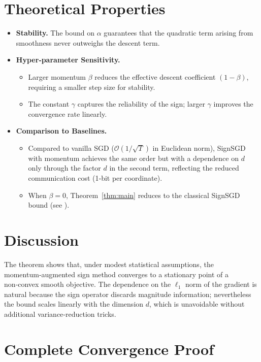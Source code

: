 \documentclass[11pt]{article}
\begin{document}
\section{Theoretical Properties}
\begin{itemize}
    \item \textbf{Stability.} The bound on $\alpha$ guarantees that the quadratic term arising from smoothness never outweighs the descent term.
    \item \textbf{Hyper‑parameter Sensitivity.}
    \begin{itemize}
        \item Larger momentum $\beta$ reduces the effective descent coefficient $(1-\beta)$, requiring a smaller step size for stability.
        \item The constant $\gamma$ captures the reliability of the sign; larger $\gamma$ improves the convergence rate linearly.
    \end{itemize}
    \item \textbf{Comparison to Baselines.}
    \begin{itemize}
        \item Compared to vanilla SGD ($\mathcal{O}(1/\sqrt{T})$ in Euclidean norm), SignSGD with momentum achieves the same order but with a dependence on $d$ only through the factor $d$ in the second term, reflecting the reduced communication cost (1‑bit per coordinate).
        \item When $\beta=0$, Theorem~\ref{thm:main} reduces to the classical SignSGD bound (see \cite{bernstein2018signsgd}).
    \end{itemize}
\end{itemize}

\section{Discussion}
The theorem shows that, under modest statistical assumptions, the momentum‑augmented sign method converges to a stationary point of a non‑convex smooth objective. The dependence on the $\ell_{1}$ norm of the gradient is natural because the sign operator discards magnitude information; nevertheless the bound scales linearly with the dimension $d$, which is unavoidable without additional variance‑reduction tricks.

\newpage
\section*{Complete Convergence Proof}
\end{document}
